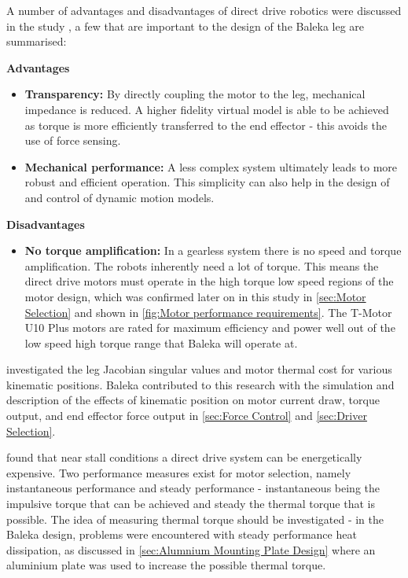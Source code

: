 A number of advantages and disadvantages of direct drive robotics were discussed in the study \cite{Kenneally2016}, a few that are important to the design of the Baleka leg are summarised:

\textbf{Advantages} 
\begin{itemize}
\item \textbf{Transparency:} By directly coupling the motor to the leg, mechanical impedance is reduced. A higher fidelity virtual model is able to be achieved as torque is more efficiently transferred to the end effector - this avoids the use of force sensing.
\item \textbf{Mechanical performance:} A less complex system ultimately leads to more robust and efficient operation. This simplicity can also help in the design of and control of dynamic motion models.
\end{itemize}

\textbf{Disadvantages} 
\begin{itemize}
\item \textbf{No torque amplification:} In a gearless system there is no speed and torque amplification. The robots inherently need a lot of torque. This means the direct drive motors must operate in the high torque low speed regions of the motor design, which was confirmed later on in this study in \cref{sec:Motor Selection} and shown in \cref{fig:Motor performance requirements}. The T-Motor U10 Plus motors are rated for maximum efficiency and power well out of the low speed high torque range that Baleka will operate at.
\end{itemize}

\cite{Kenneally2016} investigated the leg Jacobian singular values and motor thermal cost for various kinematic positions. Baleka contributed to this research with the simulation and description of the effects of kinematic position on motor current draw, torque output, and end effector force output in \cref{sec:Force Control} and \cref{sec:Driver Selection}.

\cite{Kenneally2016} found that near stall conditions a direct drive system can be energetically expensive. Two performance measures exist for motor selection, namely instantaneous performance and steady performance - instantaneous being the impulsive torque that can be achieved and steady the thermal torque that is possible.\cite{Kenneally2016} The idea of measuring thermal torque should be investigated - in the Baleka design, problems were encountered with steady performance heat dissipation, as discussed in \cref{sec:Alumnium Mounting Plate Design} where an aluminium plate was used to increase the possible thermal torque.

